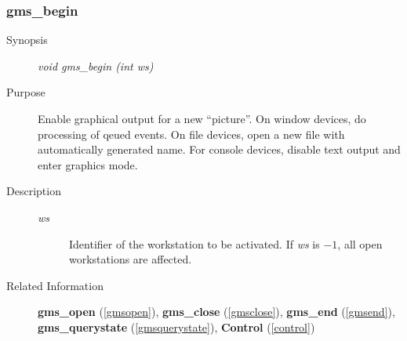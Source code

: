 \newpage



\subsubsection{gms\_begin\label{gmsbegin}}
\begin{description}
\item[Synopsis]\mbox{}


{\em void    gms\_begin (int  ws)\/}
\item[Purpose]\mbox{}


Enable  graphical output for a new ``picture''.
On window devices, do processing of qeued events.
On file devices, open a new  file with automatically generated name.
For console devices, disable text output and enter graphics mode.
\item[Description]\mbox{}


\begin{description}
\item[{\em ws\/}]\mbox{}

 Identifier of the workstation to be activated.
If {\em ws\/} is $-1$, all open workstations
are affected. 
\end{description}

\item[Related Information]\mbox{}


{\bf gms\_open} (\ref{gmsopen}), 
{\bf gms\_close} (\ref{gmsclose}), 
{\bf gms\_end} (\ref{gmsend}), 
{\bf gms\_querystate} (\ref{gmsquerystate}),
{\bf Control} (\ref{control})
\end{description}





\newpage



